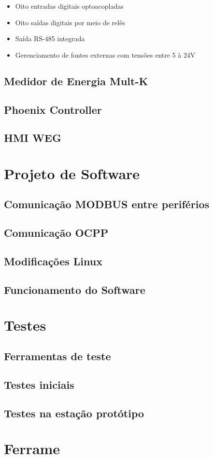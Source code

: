\begin{itemize}
  \item Oito entradas digitais optoacopladas
  \item Oito saídas digitais por meio de relês
  \item Saída RS-485 integrada
  \item Gerenciamento de fontes externas com tensões entre 5 à 24V
\end{itemize}

\subsection{Medidor de Energia Mult-K}
\subsection{Phoenix Controller}
\subsection{HMI WEG}

\section{Projeto de Software}

\subsection{Comunicação MODBUS entre periférios}
\subsection{Comunicação OCPP}
\subsection{Modificações Linux}
\subsection{Funcionamento do Software}

\section{Testes}

\subsection{Ferramentas de teste}
\subsection{Testes iniciais}
\subsection{Testes na estação protótipo}

\section{Ferrame}
